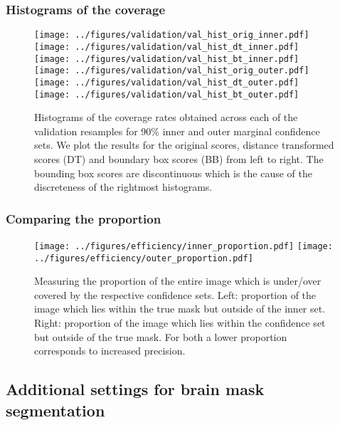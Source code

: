 \subsubsection{Histograms of the coverage}
\begin{figure}[h!]
	\begin{center}
		\texttt{[image: ../figures/validation/val\_hist\_orig\_inner.pdf]}
		\texttt{[image: ../figures/validation/val\_hist\_dt\_inner.pdf]}
		\texttt{[image: ../figures/validation/val\_hist\_bt\_inner.pdf]}\\
		\texttt{[image: ../figures/validation/val\_hist\_orig\_outer.pdf]}
		\texttt{[image: ../figures/validation/val\_hist\_dt\_outer.pdf]}
		\texttt{[image: ../figures/validation/val\_hist\_bt\_outer.pdf]}
	\end{center}
	\caption{Histograms of the coverage rates obtained across each of the validation resamples for 90\% inner and outer marginal confidence sets. We plot the results for the original scores, distance transformed scores (DT) and boundary box scores (BB) from left to right. The bounding box scores are discontinuous which is the cause of the discreteness of the rightmost histograms.}\label{fig:valhist}
\end{figure}

\subsubsection{Comparing the proportion}

\begin{figure}[h!]
	\begin{center}
		\texttt{[image: ../figures/efficiency/inner\_proportion.pdf]}
		\quad\quad
		\texttt{[image: ../figures/efficiency/outer\_proportion.pdf]}
	\end{center}
	\caption{Measuring the proportion of the entire image which is under/over covered by the respective confidence sets. Left: proportion of the image which lies within the true mask but outside of the inner set. Right: proportion of the image which lies within the confidence set but outside of the true mask. For both a lower proportion corresponds to increased precision. }\label{fig:efficiency2}
\end{figure}

\newpage
\subsection{Additional settings for brain mask segmentation}

